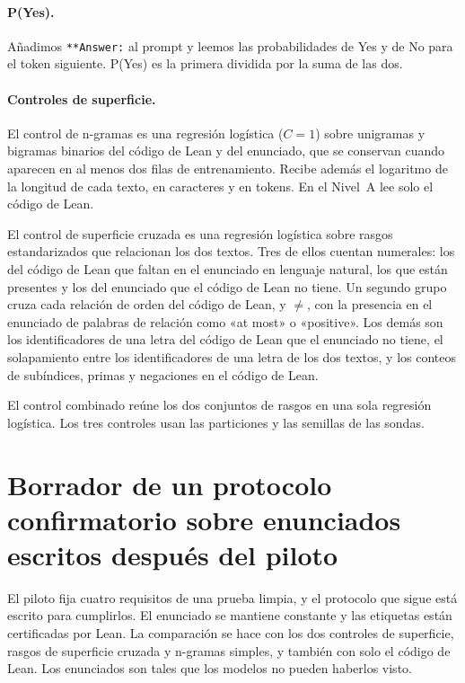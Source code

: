 \documentclass[10pt]{article}
\newcommand{\vr}[1]{\texttt{#1}}
\begin{document}
\paragraph{P(Yes).} Añadimos \vr{**Answer:} al prompt y leemos las probabilidades de Yes y de No para el token
siguiente. P(Yes) es la primera dividida por la suma de las dos.

\paragraph{Controles de superficie.} El control de n-gramas es una regresión logística ($C = 1$) sobre unigramas y
bigramas binarios del código de Lean y del enunciado, que se conservan cuando aparecen en al menos dos filas de entrenamiento.
Recibe además el logaritmo de la longitud de cada texto, en caracteres y en tokens. En el Nivel~A lee solo el código de Lean.

El control de superficie cruzada es una regresión logística sobre rasgos estandarizados que relacionan los dos textos.
Tres de ellos cuentan numerales: los del código de Lean que faltan en el enunciado en lenguaje natural, los que
están presentes y los del enunciado que el código de Lean no tiene. Un segundo grupo cruza cada relación de orden del código de Lean, y
$\neq$, con la presencia en el enunciado de palabras de relación como «at most» o «positive». Los demás son los
identificadores de una letra del código de Lean que el enunciado no tiene, el solapamiento entre los identificadores de una
letra de los dos textos, y los conteos de subíndices, primas y negaciones en el código de Lean.

El control combinado reúne los dos conjuntos de rasgos en una sola regresión logística. Los tres controles usan las
particiones y las semillas de las sondas.

\section{Borrador de un protocolo confirmatorio sobre enunciados escritos después del piloto}\label{app:protocolo}

El piloto fija cuatro requisitos de una prueba limpia, y el protocolo que sigue está escrito para cumplirlos. El
enunciado se mantiene constante y las etiquetas están certificadas por Lean. La comparación se hace con los dos
controles de superficie, rasgos de superficie cruzada y n-gramas simples, y también con solo el código de Lean. Los enunciados son
tales que los modelos no pueden haberlos visto.
\end{document}
